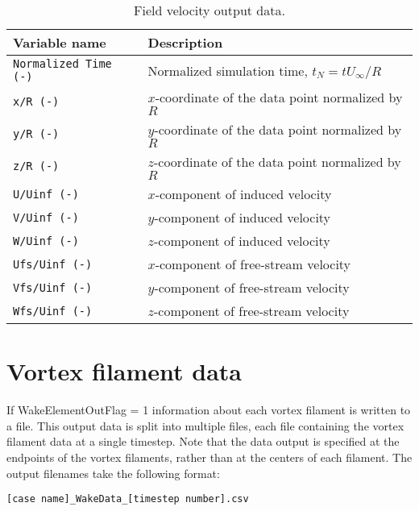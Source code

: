 \begin{table}[!htbp]
\centering
\caption{Field velocity output data.}
\label{tbl:output_cartesian_velocity}
\begin{tabular}{p{}p{}}
\toprule
Variable name & Description \\ \midrule
\texttt{Normalized Time (-)} & Normalized simulation time, $t_N=t U_\infty/R$ \\
\texttt{x/R (-)}             & $x$-coordinate of the data point normalized by $R$ \\
\texttt{y/R (-)}             & $y$-coordinate of the data point normalized by $R$ \\
\texttt{z/R (-)}             & $z$-coordinate of the data point normalized by $R$ \\
\texttt{U/Uinf (-)}          & $x$-component of induced velocity              \\
\texttt{V/Uinf (-)}          & $y$-component of induced velocity              \\
\texttt{W/Uinf (-)}          & $z$-component of induced velocity              \\
\texttt{Ufs/Uinf (-)}        & $x$-component of free-stream velocity          \\
\texttt{Vfs/Uinf (-)}        & $y$-component of free-stream velocity          \\
\texttt{Wfs/Uinf (-)}        & $z$-component of free-stream velocity          \\
\bottomrule
\end{tabular}
\end{table}

\section{Vortex filament data}
If WakeElementOutFlag = 1 information about each vortex filament is written to a file. This output data is split into multiple files, each file containing the vortex filament data at a single timestep.
Note that the data output is specified at the endpoints of the vortex filaments, rather than at the centers of each filament.
The output filenames take the following format:

\begin{lstlisting}
[case name]_WakeData_[timestep number].csv
\end{lstlisting}

